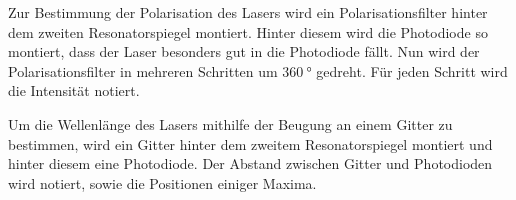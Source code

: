 Zur Bestimmung der Polarisation des Lasers wird ein Polarisationsfilter hinter dem zweiten Resonatorspiegel montiert. Hinter diesem wird die Photodiode so montiert, dass der Laser besonders gut in die Photodiode fällt. Nun wird der Polarisationsfilter in mehreren Schritten um $\SI{360}{\degree}$ gedreht. Für jeden Schritt wird die Intensität notiert.

Um die Wellenlänge des Lasers mithilfe der Beugung an einem Gitter zu bestimmen, wird ein Gitter hinter dem zweitem Resonatorspiegel montiert und hinter diesem eine Photodiode. Der Abstand zwischen Gitter und Photodioden wird notiert, sowie die Positionen einiger Maxima.